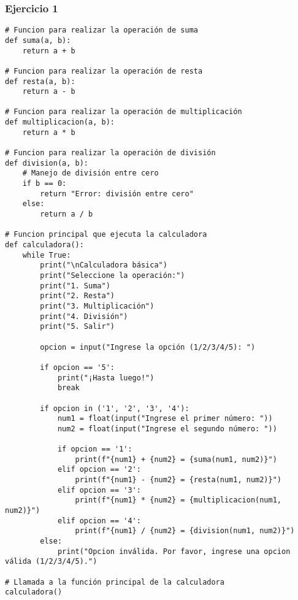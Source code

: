 \documentclass[10pt,a4paper]{article}
\begin{document}
\subsubsection{Ejercicio 1}
\begin{lstlisting}
# Funcion para realizar la operación de suma
def suma(a, b):
    return a + b

# Funcion para realizar la operación de resta
def resta(a, b):
    return a - b

# Funcion para realizar la operación de multiplicación
def multiplicacion(a, b):
    return a * b

# Funcion para realizar la operación de división
def division(a, b):
    # Manejo de división entre cero
    if b == 0:
        return "Error: división entre cero"
    else:
        return a / b

# Funcion principal que ejecuta la calculadora
def calculadora():
    while True:
        print("\nCalculadora básica")
        print("Seleccione la operación:")
        print("1. Suma")
        print("2. Resta")
        print("3. Multiplicación")
        print("4. División")
        print("5. Salir")

        opcion = input("Ingrese la opción (1/2/3/4/5): ")

        if opcion == '5':
            print("¡Hasta luego!")
            break
        
        if opcion in ('1', '2', '3', '4'):
            num1 = float(input("Ingrese el primer número: "))
            num2 = float(input("Ingrese el segundo número: "))

            if opcion == '1':
                print(f"{num1} + {num2} = {suma(num1, num2)}")
            elif opcion == '2':
                print(f"{num1} - {num2} = {resta(num1, num2)}")
            elif opcion == '3':
                print(f"{num1} * {num2} = {multiplicacion(num1, num2)}")
            elif opcion == '4':
                print(f"{num1} / {num2} = {division(num1, num2)}")
        else:
            print("Opcion inválida. Por favor, ingrese una opcion válida (1/2/3/4/5).")

# Llamada a la función principal de la calculadora
calculadora()

\end{lstlisting}
\newpage
\end{document}
